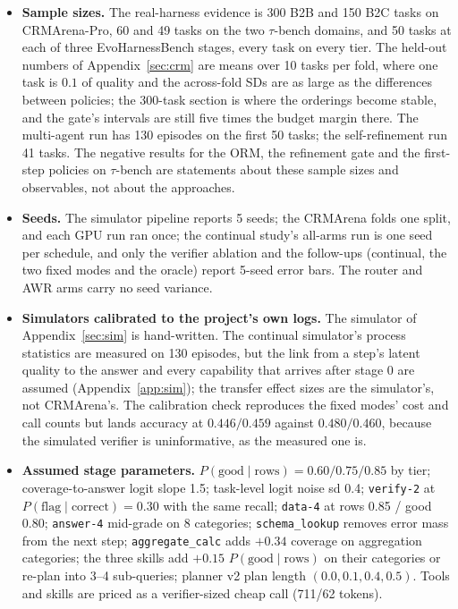 \documentclass[10pt]{article}
\newcommand{\code}[1]{\texttt{#1}}
\begin{document}
\begin{itemize}
\item \textbf{Sample sizes.} The real-harness evidence is 300 B2B and 150 B2C tasks on CRMArena-Pro, 60 and 49 tasks on the two $\tau$-bench domains, and 50 tasks at each of three EvoHarnessBench stages, every task on every tier. The held-out numbers of Appendix~\ref{sec:crm} are means over 10 tasks per fold, where one task is $0.1$ of quality and the across-fold SDs are as large as the differences between policies; the 300-task section is where the orderings become stable, and the gate's intervals are still five times the budget margin there. The multi-agent run has 130 episodes on the first 50 tasks; the self-refinement run 41 tasks. The negative results for the ORM, the refinement gate and the first-step policies on $\tau$-bench are statements about these sample sizes and observables, not about the approaches.
\item \textbf{Seeds.} The simulator pipeline reports 5 seeds; the CRMArena folds one split, and each GPU run ran once; the continual study's all-arms run is one seed per schedule, and only the verifier ablation and the follow-ups (continual, the two fixed modes and the oracle) report 5-seed error bars. The router and AWR arms carry no seed variance.
\item \textbf{Simulators calibrated to the project's own logs.} The simulator of Appendix~\ref{sec:sim} is hand-written. The continual simulator's process statistics are measured on 130 episodes, but the link from a step's latent quality to the answer and every capability that arrives after stage 0 are assumed (Appendix~\ref{app:sim}); the transfer effect sizes are the simulator's, not CRMArena's. The calibration check reproduces the fixed modes' cost and call counts but lands accuracy at $0.446/0.459$ against $0.480/0.460$, because the simulated verifier is uninformative, as the measured one is.
\item \textbf{Assumed stage parameters.} $P(\text{good}\mid\text{rows})=0.60/0.75/0.85$ by tier; coverage-to-answer logit slope 1.5; task-level logit noise sd 0.4; \code{verify-2} at $P(\text{flag}\mid\text{correct})=0.30$ with the same recall; \code{data-4} at rows 0.85 / good 0.80; \code{answer-4} mid-grade on 8 categories; \code{schema\_lookup} removes error mass from the next step; \code{aggregate\_calc} adds $+0.34$ coverage on aggregation categories; the three skills add $+0.15$ $P(\text{good}\mid\text{rows})$ on their categories or re-plan into 3--4 sub-queries; planner v2 plan length $(0.0,0.1,0.4,0.5)$. Tools and skills are priced as a verifier-sized cheap call (711/62 tokens).

\end{itemize}
\end{document}
